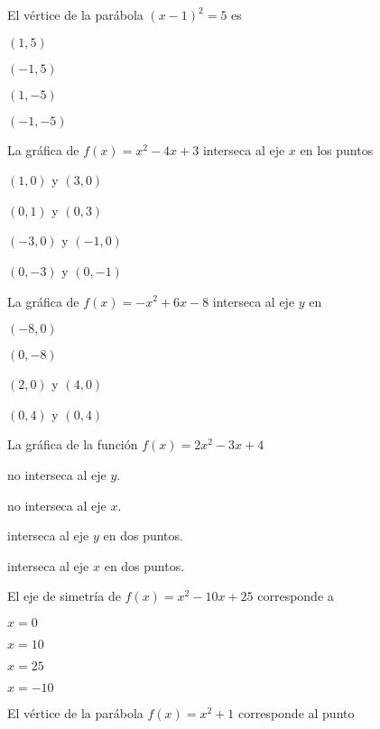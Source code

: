 \documentclass[12pt, fleqn]{article}
\begin{document}
\item El vértice de la parábola $(x-1)^2=5$ es
\vp

\benu
\item[] \opc $(1,5)$ \vp
\item[] \opc $(-1,5)$ \vp
\item[] \opc $(1,-5)$ \vp
\item[] \opc $(-1,-5)$
\eenu
\vs

\item La gráfica de $f(x)=x^2-4x+3$ interseca al eje $x$ en los puntos \vp

\benu
\item[] \opc $(1,0)$ y $(3,0)$ \vp
\item[] \opc $(0,1)$ y $(0,3)$ \vp
\item[] \opc $(-3,0)$ y $(-1,0)$ \vp
\item[] \opc $(0,-3)$ y $(0,-1)$
\eenu\vs

\item La gráfica de $f(x)=-x^2+6x-8$ interseca al eje $y$ en \vp

\benu
\item[] \opc $(-8,0)$ \vp
\item[] \opc $(0,-8)$ \vp
\item[] \opc $(2,0)$ y $(4,0)$ \vp
\item[] \opc $(0,4)$ y $(0,4)$
\eenu\vs

\pagebreak

\item La gráfica de la función $f(x)=2x^2-3x+4$ \vp

\benu
\item[] \opc no interseca al eje $y$. \vp
\item[] \opc no interseca al eje $x$. \vp
\item[] \opc interseca al eje $y$ en dos puntos. \vp
\item[] \opc interseca al eje $x$ en dos puntos.
\eenu
\vp

\item El eje de simetría de $f(x)=x^2-10x+25$ corresponde a

\benu
\item[] \opc $x=0$ \vf
\item[] \opc $x=10$ \vf
\item[] \opc $x=25$ \vf
\item[] \opc $x=-10$
\eenu\vs

\item El vértice de la parábola $f(x)=x^2+1$ corresponde al punto
\end{document}
